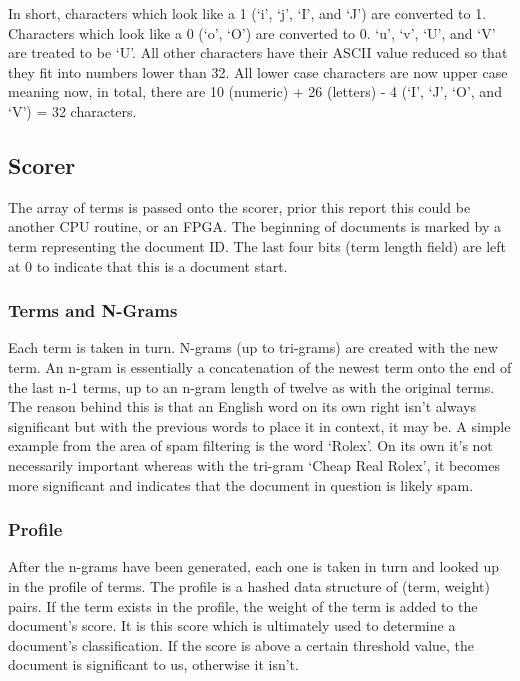 In short, characters which look like a 1 (`i', `j', `I', and `J') are converted
to 1. Characters which look like a 0 (`o', `O') are converted to 0. `u', `v',
`U', and `V' are treated to be `U'. All other characters have their ASCII value
reduced so that they fit into numbers lower than 32. All lower case characters
are now upper case meaning now, in total, there are 10 (numeric) + 26 (letters)
- 4 (`I', `J', `O', and `V') = 32 characters.

\subsection{Scorer}

The array of terms is passed onto the scorer, prior this report this could be
another CPU routine, or an FPGA. The beginning of documents is marked by a term
representing the document ID. The last four bits (term length field) are left
at 0 to indicate that this is a document start.

\subsubsection{Terms and N-Grams}

Each term is taken in turn. N-grams (up to tri-grams) are created with the new
term. An n-gram is essentially a concatenation of the newest term onto the end
of the last n-1 terms, up to an n-gram length of twelve as with the original
terms. The reason behind this is that an English word on its own right isn't
always significant but with the previous words to place it in context, it may
be. A simple example from the area of spam filtering is the word `Rolex'. On its
own it's not necessarily important whereas with the tri-gram `Cheap Real Rolex',
it becomes more significant and indicates that the document in question is
likely spam.

\subsubsection{Profile}

After the n-grams have been generated, each one is taken in turn and looked up
in the profile of terms. The profile is a hashed data structure of (term,
weight) pairs. If the term exists in the profile, the weight of the term is
added to the document's score. It is this score which is ultimately used to
determine a document's classification. If the score is above a certain threshold
value, the document is significant to us, otherwise it isn't.

